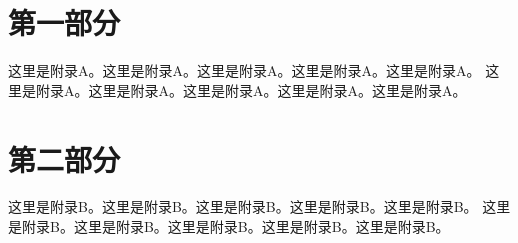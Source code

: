 
\newpage


\appendix


\section{第一部分}\label{sec:appendix-1}

这里是附录A。这里是附录A。这里是附录A。这里是附录A。这里是附录A。
这里是附录A。这里是附录A。这里是附录A。这里是附录A。这里是附录A。

\section{第二部分}

这里是附录B。这里是附录B。这里是附录B。这里是附录B。这里是附录B。
这里是附录B。这里是附录B。这里是附录B。这里是附录B。这里是附录B。





